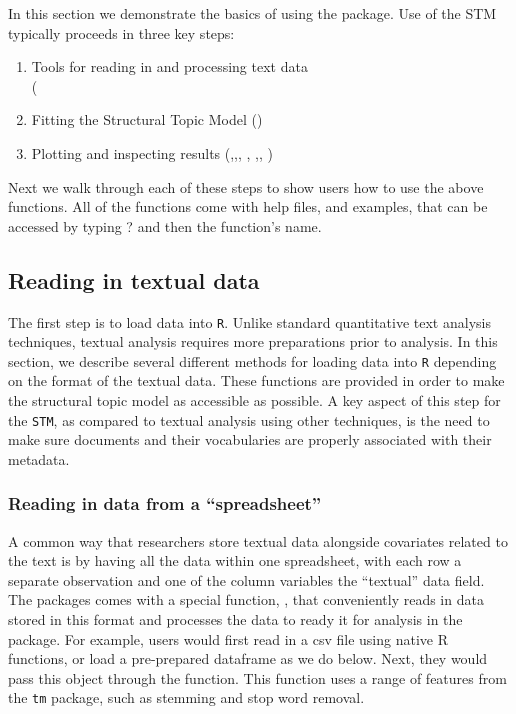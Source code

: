 \documentclass[nojss]{jss}
\begin{document}
In this section we demonstrate the basics of using the package. Use of the STM typically proceeds in three key steps:
\begin{enumerate}
\item Tools for reading in and processing text data \\
(\\
\item Fitting the Structural Topic Model
()
\item Plotting and inspecting results
(,,, , ,, )
\end{enumerate}

Next we walk through each of these steps to show users how to use the above functions. All of the functions come with help files, and examples, that can be accessed by typing ? and then the function's name. 

\subsection{Reading in textual data}

The first step is to load data into \texttt{R}. Unlike standard quantitative text analysis techniques, textual analysis requires more preparations prior to analysis. In this section, we describe several different methods for loading data into \texttt{R} depending on the format of the textual data. These functions are provided in order to make the structural topic model as accessible as possible. A key aspect of this step for the \texttt{STM}, as compared to textual analysis using other techniques, is the need to make sure documents and their vocabularies are properly associated with their metadata.

\subsubsection{Reading in data from a ``spreadsheet''}

A common way that researchers store textual data alongside covariates related to the text is by having all the data within one spreadsheet, with each row a separate observation and one of the column variables the ``textual'' data field. The  packages comes with a special function, , that conveniently reads in data stored in this format and processes the data to ready it for analysis in the  package. For example, users would first read in a csv file using native R functions, or load a pre-prepared dataframe as we do below. Next, they would pass this object through the  function. This function uses a range of features from the \texttt{tm} package, such as stemming and stop word removal.
\end{document}

